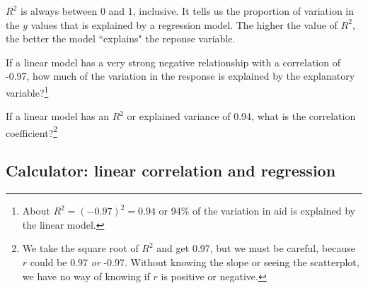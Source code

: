 \begin{termBox}{
$R^2$ is always between 0 and 1, inclusive.  It tells us the proportion of variation in the $y$ values that is explained by a regression model.  The higher the value of $R^2$, the better the model ``explains" the reponse variable.
}
\end{termBox}

\begin{exercise}
If a linear model has a very strong negative relationship with a correlation of -0.97, how much of the variation in the response is explained by the explanatory variable?\footnote{About $R^2 = (-0.97)^2 = 0.94$ or 94\% of the variation in aid is explained by the linear model.}
\end{exercise}

\begin{exercise}
If a linear model has an $R^2$ or explained variance of 0.94, what is the correlation coefficient?\footnote{We take the square root of $R^2$ and get 0.97, but we must be careful, because $r$ could be 0.97 \emph{or} -0.97.  Without knowing the slope or seeing the scatterplot, we have no way of knowing if $r$ is positive or negative.}
\end{exercise}


\subsection{Calculator: linear correlation and regression}

